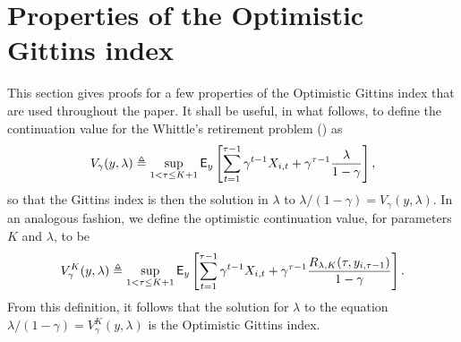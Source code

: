 \section{Properties of the Optimistic Gittins index}\label{sec:appendix_properties_of_ogi}
This section gives proofs for a few properties of the Optimistic Gittins index that are used throughout the paper.  
It shall be useful, in what follows, to define the continuation value for the Whittle's retirement problem (\cite{whittle1980multi}) as
\[
V_\gamma(y, \lambda)  \triangleq \sup_{1 < \tau \le K+1} \mathsf{E}_y\left[\sum_{t=1}^{\tau-1} \gamma^{t-1} X_{i,t} + \gamma^{\tau-1} \frac{\lambda}{1-\gamma}\right],
\]
so that the Gittins index is then the solution in $\lambda$ to $\lambda/(1-\gamma) = V_\gamma(y, \lambda)$. In an analogous fashion, we define the optimistic continuation value, for parameters $K$ and $\lambda$, to be
\[
V^K_\gamma(y, \lambda) \triangleq \sup_{1 < \tau \le K+1} \mathsf{E}_y\left[\sum_{t=1}^{\tau-1} \gamma^{t-1}  X_{i,t} + \gamma^{\tau-1} \frac{R_{\lambda, K}(\tau, y_{i,\tau-1})}{1-\gamma}\right].
\]
From this definition, it follows that the solution for $\lambda$ to the equation $\lambda/(1-\gamma) = V^K_\gamma(y, \lambda)$ is the Optimistic Gittins index.
